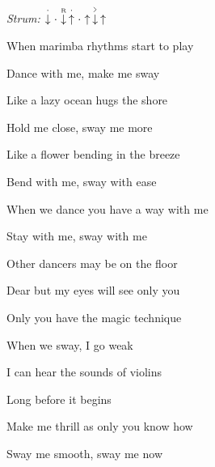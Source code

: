 \begin{song}


\begin{headerbox}
\RaiseBoxWithAccents
{} \quad
\textit{Strum:} $\StaccatoDown\Miss\PluckDown{R}\StaccatoUp\Miss\Up\AccentDown\Up$
\end{headerbox}

\begin{hchordbox}
\end{hchordbox}

\Large

\bigskip

When marimba rhythms start to play \par
Dance with me, make me sway \par
Like a lazy ocean hugs the shore \par
Hold me close, sway me more \par

\bigskip

Like a flower bending in the breeze \par
Bend with me, sway with ease \par
When we dance you have a way with me \par
Stay with me, sway with me \par

\bigskip

Other dancers may be on the floor \par
Dear but my eyes will see only you \par
Only you have the magic technique \par
When we sway, I go weak  \par

\bigskip

I can hear the sounds of violins \par
Long before it begins \par
Make me thrill as only you know how \par
Sway me smooth, sway me now \par

\bigskip

  \par
{}  \par


\end{song}
